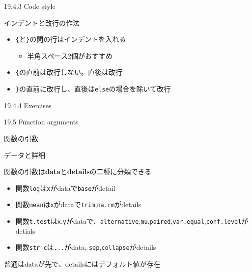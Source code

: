 \documentclass[ignorenonframetext,]{beamer}
\providecommand{\tightlist}{%
  \setlength{\itemsep}{0pt}\setlength{\parskip}{0pt}}
\begin{document}
\begin{frame}[fragile]{19.4.3 Code style}

インデントと改行の作法

\begin{itemize}
\tightlist
\item
  \texttt{\{}と\texttt{\}}の間の行はインデントを入れる

  \begin{itemize}
  \tightlist
  \item
    半角スペース2個がおすすめ
  \end{itemize}
\item
  \texttt{\{}の直前は改行しない。直後は改行
\item
  \texttt{\}}の直前に改行し、直後は\texttt{else}の場合を除いて改行
\end{itemize}

\end{frame}

\begin{frame}{19.4.4 Exercises}

\end{frame}

\begin{frame}{19.5 Function arguments}

関数の引数

\end{frame}

\begin{frame}[fragile]{データと詳細}

関数の引数は\textbf{data}と\textbf{details}の二種に分類できる

\begin{itemize}
\tightlist
\item
  関数\texttt{log}は\texttt{x}がdataで\texttt{base}がdetail
\item
  関数\texttt{mean}は\texttt{x}がdataで\texttt{trim},\texttt{na.rm}がdetails
\item
  関数\texttt{t.test}は\texttt{x},\texttt{y}がdataで、\texttt{alternative},\texttt{mu},\texttt{paired},\texttt{var.equal},\texttt{conf.level}がdetials
\item
  関数\texttt{str\_c}は\texttt{...}がdata,
  \texttt{sep},\texttt{collapse}がdetails
\end{itemize}

普通はdataが先で、detailsにはデフォルト値が存在

\end{frame}
\end{document}
